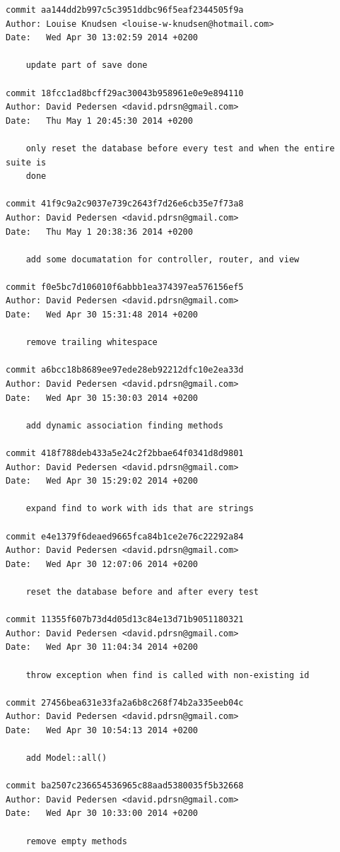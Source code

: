 \documentclass[12pt]{article}
\begin{document}
\begin{verbatim}
commit aa144dd2b997c5c3951ddbc96f5eaf2344505f9a
Author: Louise Knudsen <louise-w-knudsen@hotmail.com>
Date:   Wed Apr 30 13:02:59 2014 +0200

    update part of save done

commit 18fcc1ad8bcff29ac30043b958961e0e9e894110
Author: David Pedersen <david.pdrsn@gmail.com>
Date:   Thu May 1 20:45:30 2014 +0200

    only reset the database before every test and when the entire suite is
    done

commit 41f9c9a2c9037e739c2643f7d26e6cb35e7f73a8
Author: David Pedersen <david.pdrsn@gmail.com>
Date:   Thu May 1 20:38:36 2014 +0200

    add some documatation for controller, router, and view

commit f0e5bc7d106010f6abbb1ea374397ea576156ef5
Author: David Pedersen <david.pdrsn@gmail.com>
Date:   Wed Apr 30 15:31:48 2014 +0200

    remove trailing whitespace

commit a6bcc18b8689ee97ede28eb92212dfc10e2ea33d
Author: David Pedersen <david.pdrsn@gmail.com>
Date:   Wed Apr 30 15:30:03 2014 +0200

    add dynamic association finding methods

commit 418f788deb433a5e24c2f2bbae64f0341d8d9801
Author: David Pedersen <david.pdrsn@gmail.com>
Date:   Wed Apr 30 15:29:02 2014 +0200

    expand find to work with ids that are strings

commit e4e1379f6deaed9665fca84b1ce2e76c22292a84
Author: David Pedersen <david.pdrsn@gmail.com>
Date:   Wed Apr 30 12:07:06 2014 +0200

    reset the database before and after every test

commit 11355f607b73d4d05d13c84e13d71b9051180321
Author: David Pedersen <david.pdrsn@gmail.com>
Date:   Wed Apr 30 11:04:34 2014 +0200

    throw exception when find is called with non-existing id

commit 27456bea631e33fa2a6b8c268f74b2a335eeb04c
Author: David Pedersen <david.pdrsn@gmail.com>
Date:   Wed Apr 30 10:54:13 2014 +0200

    add Model::all()

commit ba2507c236654536965c88aad5380035f5b32668
Author: David Pedersen <david.pdrsn@gmail.com>
Date:   Wed Apr 30 10:33:00 2014 +0200

    remove empty methods


\end{verbatim}
\end{document}
